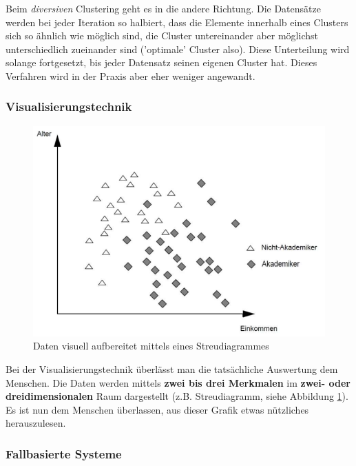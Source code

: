 \documentclass[a4paper, 11pt]{article}
\begin{document}
 \vspace{10px}
 
 \noindent Beim \textit{diversiven} Clustering geht es in die andere Richtung. Die Datensätze werden bei jeder Iteration so halbiert, dass die Elemente innerhalb eines Clusters sich so ähnlich wie möglich sind, die Cluster untereinander aber möglichst unterschiedlich zueinander sind ('optimale' Cluster also). Diese Unterteilung wird solange fortgesetzt, bis jeder Datensatz seinen eigenen Cluster hat. Dieses Verfahren wird in der Praxis aber eher weniger angewandt.
 
 \subsubsection{Visualisierungstechnik}
 \begin{figure}
 	\centering
 	\includegraphics[keepaspectratio=true,height=13\baselineskip]{streudiagramm.PNG}
 	\caption{Daten visuell aufbereitet mittels eines Streudiagrammes}
 	\label{fig:streu}
 \end{figure}
 Bei der Visualisierungstechnik überlässt man die tatsächliche Auswertung dem Menschen. Die Daten werden mittels \textbf{zwei bis drei Merkmalen} im \textbf{zwei- oder dreidimensionalen} Raum dargestellt (z.B. Streudiagramm, siehe Abbildung \ref{fig:streu}). Es ist nun dem Menschen überlassen, aus dieser Grafik etwas nützliches herauszulesen.
 
 \vspace{90px}

\subsubsection{Fallbasierte Systeme}
\end{document}

